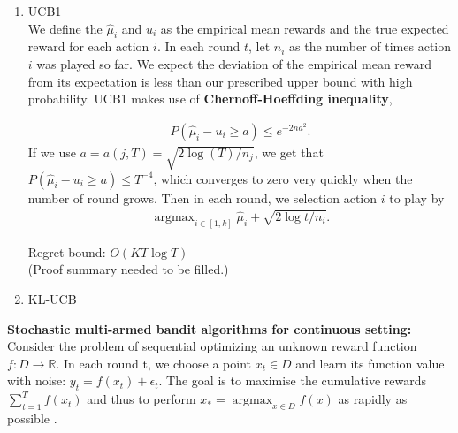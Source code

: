 \documentclass[11pt]{article}
\DeclareMathOperator*{\argmax}{argmax}
\begin{document}
\begin{enumerate}
    \begin{enumerate}
        \item UCB1\\
        We define the $\hat{\mu}_i$ and $u_i$ as the empirical mean rewards and the true expected reward for each action $i$. In each round $t$, let $n_i$ as the number of times action $i$ was played so far. 
        We expect the deviation of the empirical mean reward from its expectation is less than our prescribed upper bound with high probability. UCB1 makes use of \textbf{Chernoff-Hoeffding inequality},

        \begin{align}
            P(\hat{\mu}_i - u_i \geq a) \leq e^{-2na^2}.
        \end{align}
        If we use $a = a(j,T) = \sqrt{2\log(T)/n_j}$, we get that $P(\hat{\mu}_i - u_i \geq a) \leq T^{-4}$, which converges to zero very quickly when the number of round grows. Then in each round, we selection action $i$ to play by
        \begin{align}
            \argmax_{i \in [1,k]} \hat{\mu}_i + \sqrt{2 \log t/ n_i}.
        \end{align}
        
        Regret bound: $O(KT\log T)$\\
        (Proof summary needed to be filled.)
        \item KL-UCB
    \end{enumerate}
    
    \textbf{Stochastic multi-armed bandit algorithms for continuous setting:}\\
     Consider the problem of sequential optimizing an unknown reward function $f: D \rightarrow \mathbb{R}$. In each round t, we choose a point $x_t \in D$ and learn its function value with noise: $y_t = f(x_t) + \epsilon_t$. The goal is to maximise the cumulative rewards $\sum_{t=1}^T f(x_t)$ and thus to perform $x_\ast = \argmax_{x \in D} f(x)$ as rapidly as possible \cite{srinivas2012}.
     

\end{enumerate}
\end{document}
